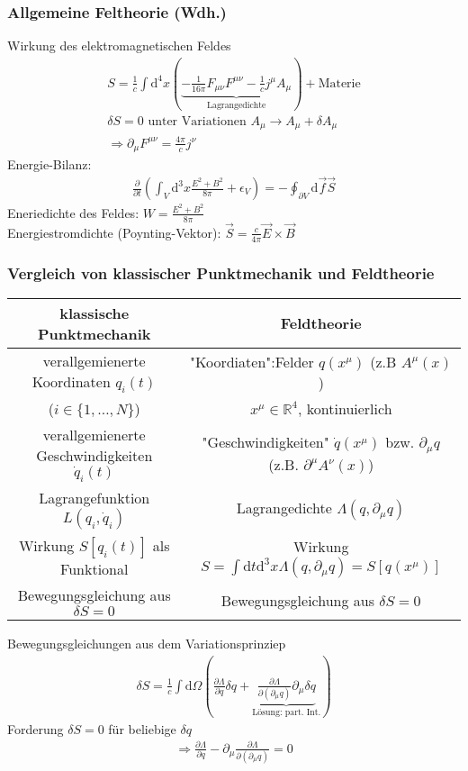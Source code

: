 \documentclass[a4paper]{article}
\begin{document}
\subsubsection{Allgemeine Feltheorie (Wdh.)}
Wirkung des elektromagnetischen Feldes 
\begin{align}
S=\frac{1}{c}\int \mathrm{d}^4x\left(\underbrace{-\frac{1}{16\pi}F_{\mu\nu}F^{\mu\nu}-
\frac{1}{c}j^\mu A_\mu}_{\text{Lagrangedichte}} \right) +\text{Materie}\\
\delta S=0 \text{ unter Variationen } A_\mu \rightarrow A_\mu+\delta A_\mu\\
\Rightarrow \partial_\mu F^{\mu\nu}=\frac{4\pi}{c}j^\nu
\end{align}
Energie-Bilanz:
\begin{align}
\frac{\partial}{\partial t}\left(\int_V \mathrm{d}^3x
\frac{E^2+B^2}{8\pi}+\epsilon_V\right)=-\oint_{\partial V} \mathrm{d}\vec{f}\vec{S}
\end{align}
Eneriedichte des Feldes: $W=\frac{E^2+B^2}{8\pi}$\\
Energiestromdichte (Poynting-Vektor):
$\vec{S}=\frac{c}{4\pi}\vec{E}\times\vec{B}$
\subsubsection{Vergleich von klassischer Punktmechanik und Feldtheorie}

\begin{tabular}{c|c}
klassische Punktmechanik & Feldtheorie\\  
\hline\hline
verallgemienerte Koordinaten $q_i(t)$ &
"Koordiaten":Felder $q(x^\mu)$ (z.B $A^\mu(x)$)
\\
($i\in \{1,\ldots,N\}$)&$x^\mu \in \mathbb{R}^4$, kontinuierlich\\
verallgemienerte Geschwindigkeiten $\dot{q}_i(t)$&
"Geschwindigkeiten" $\dot{q}(x^\mu)$ bzw. $\partial_\mu q$ (z.B.
$\partial^\mu A^\nu(x)$)\\
Lagrangefunktion $L(q_i,\dot{q}_i)$ & Lagrangedichte $\Lambda(q,\partial_\mu
q)$\\
Wirkung $S[q_i(t)]$ als Funktional & Wirkung $S=\int \mathrm{d}t \mathrm{d}^3x
\Lambda(q,\partial_\mu q)=S[q(x^\mu)]$\\
Bewegungsgleichung aus $\delta S=0$&Bewegungsgleichung aus $\delta S=0$\\
\end{tabular}

Bewegungsgleichungen aus dem Variationsprinziep
\begin{align}
\delta S=\frac{1}{c}\int \mathrm{d}\Omega \left( \frac{\partial
\Lambda}{\partial\!q}\delta\!q +\underbrace{\frac{\partial \Lambda}{\partial\!
(\partial_\mu\! q)} \partial_\mu\! \delta\!q}_{\text{Lösung: part. Int.}}
\right)
\end{align}
Forderung $\delta S=0$ für beliebige $\delta q$
\begin{align}
\Rightarrow  \frac{\partial
\Lambda}{\partial\!q} -\partial_\mu \frac{\partial \Lambda}{\partial\!
(\partial_\mu\! q)}=0
\end{align}
\end{document}

